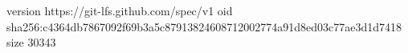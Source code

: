version https://git-lfs.github.com/spec/v1
oid sha256:c4364db7867092f69b3a5c87913824608712002774a91d8ed03c77ae3d1d7418
size 30343
